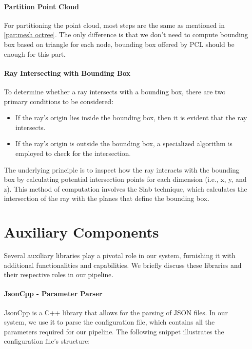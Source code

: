 \documentclass[11pt, a4paper,oneside,chapterprefix=false]{scrbook}
\begin{document}
\paragraph{Partition Point Cloud}

For partitioning the point cloud, most steps are the same as mentioned in \ref{par:mesh octree}. The only difference is that we don't need to compute bounding box based on triangle for each node, bounding box offered by PCL should be enough for this part.

\paragraph{Ray Intersecting with Bounding Box}

To determine whether a ray intersects with a bounding box, there are two primary conditions to be considered:

\begin{itemize}
    \item If the ray's origin lies inside the bounding box, then it is evident that the ray intersects.
    \item If the ray's origin is outside the bounding box, a specialized algorithm is employed to check for the intersection.
\end{itemize}

The underlying principle is to inspect how the ray interacts with the bounding box by calculating potential intersection points for each dimension (i.e., x, y, and z). This method of computation involves the Slab technique, which calculates the intersection of the ray with the planes that define the bounding box.


\section{Auxiliary Components} \label{subsec:supporting libraries}

Several auxiliary libraries play a pivotal role in our system, furnishing it with additional functionalities and capabilities. We briefly discuss these libraries and their respective roles in our pipeline.

\paragraph{JsonCpp - Parameter Parser} \label{par:jsoncpp}

JsonCpp is a C++ library that allows for the parsing of JSON files. In our system, we use it to parse the configuration file, which contains all the parameters required for our pipeline. The following snippet illustrates the configuration file's structure:
\end{document}
